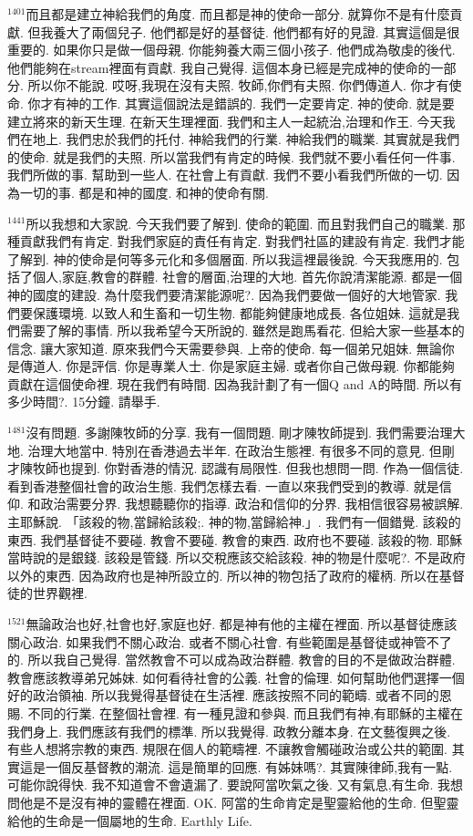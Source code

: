 \documentclass{book}
\begin{document}
$^{1401}$而且都是建立神給我們的角度.
而且都是神的使命一部分.
就算你不是有什麼貢獻.
但我養大了兩個兒子.
他們都是好的基督徒.
他們都有好的見證.
其實這個是很重要的.
如果你只是做一個母親.
你能夠養大兩三個小孩子.
他們成為敬虔的後代.
他們能夠在stream裡面有貢獻.
我自己覺得.
這個本身已經是完成神的使命的一部分.
所以你不能說.
哎呀,我現在沒有夫照.
牧師,你們有夫照.
你們傳道人.
你才有使命.
你才有神的工作.
其實這個說法是錯誤的.
我們一定要肯定.
神的使命.
就是要建立將來的新天生理.
在新天生理裡面.
我們和主人一起統治,治理和作王.
今天我們在地上.
我們忠於我們的托付.
神給我們的行業.
神給我們的職業.
其實就是我們的使命.
就是我們的夫照.
所以當我們有肯定的時候.
我們就不要小看任何一件事.
我們所做的事.
幫助到一些人.
在社會上有貢獻.
我們不要小看我們所做的一切.
因為一切的事.
都是和神的國度.
和神的使命有關.

$^{1441}$所以我想和大家說.
今天我們要了解到.
使命的範圍.
而且對我們自己的職業.
那種貢獻我們有肯定.
對我們家庭的責任有肯定.
對我們社區的建設有肯定.
我們才能了解到.
神的使命是何等多元化和多個層面.
所以我這裡最後說.
今天我應用的.
包括了個人,家庭,教會的群體.
社會的層面,治理的大地.
首先你說清潔能源.
都是一個神的國度的建設.
為什麼我們要清潔能源呢?.
因為我們要做一個好的大地管家.
我們要保護環境.
以致人和生畜和一切生物.
都能夠健康地成長.
各位姐妹.
這就是我們需要了解的事情.
所以我希望今天所說的.
雖然是跑馬看花.
但給大家一些基本的信念.
讓大家知道.
原來我們今天需要參與.
上帝的使命.
每一個弟兄姐妹.
無論你是傳道人.
你是評信.
你是專業人士.
你是家庭主婦.
或者你自己做母親.
你都能夠貢獻在這個使命裡.
現在我們有時間.
因為我計劃了有一個Q and A的時間.
所以有多少時間?.
15分鐘.
請舉手.

$^{1481}$沒有問題.
多謝陳牧師的分享.
我有一個問題.
剛才陳牧師提到.
我們需要治理大地.
治理大地當中.
特別在香港過去半年.
在政治生態裡.
有很多不同的意見.
但剛才陳牧師也提到.
你對香港的情況.
認識有局限性.
但我也想問一問.
作為一個信徒.
看到香港整個社會的政治生態.
我們怎樣去看.
一直以來我們受到的教導.
就是信仰.
和政治需要分界.
我想聽聽你的指導.
政治和信仰的分界.
我相信很容易被誤解.
主耶穌說.
「該殺的物,當歸給該殺;.
神的物,當歸給神.」.
我們有一個錯覺.
該殺的東西.
我們基督徒不要碰.
教會不要碰.
教會的東西.
政府也不要碰.
該殺的物.
耶穌當時說的是銀錢.
該殺是管錢.
所以交稅應該交給該殺.
神的物是什麼呢?.
不是政府以外的東西.
因為政府也是神所設立的.
所以神的物包括了政府的權柄.
所以在基督徒的世界觀裡.

$^{1521}$無論政治也好,社會也好,家庭也好.
都是神有他的主權在裡面.
所以基督徒應該關心政治.
如果我們不關心政治.
或者不關心社會.
有些範圍是基督徒或神管不了的.
所以我自己覺得.
當然教會不可以成為政治群體.
教會的目的不是做政治群體.
教會應該教導弟兄姊妹.
如何看待社會的公義.
社會的倫理.
如何幫助他們選擇一個好的政治領袖.
所以我覺得基督徒在生活裡.
應該按照不同的範疇.
或者不同的恩賜.
不同的行業.
在整個社會裡.
有一種見證和參與.
而且我們有神,有耶穌的主權在我們身上.
我們應該有我們的標準.
所以我覺得.
政教分離本身.
在文藝復興之後.
有些人想將宗教的東西.
規限在個人的範疇裡.
不讓教會觸碰政治或公共的範圍.
其實這是一個反基督教的潮流.
這是簡單的回應.
有姊妹嗎?.
其實陳律師,我有一點.
可能你說得快.
我不知道會不會遺漏了.
要說阿當吹氣之後.
又有氣息,有生命.
我想問他是不是沒有神的靈體在裡面.
OK.
阿當的生命肯定是聖靈給他的生命.
但聖靈給他的生命是一個屬地的生命.
Earthly Life.
\end{document}
